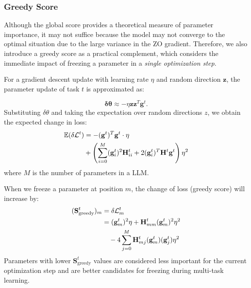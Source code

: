 \subsubsection{Greedy Score}

Although the global score provides a theoretical measure of parameter importance, it may not suffice because the model may not converge to the optimal situation due to the large variance in the ZO gradient. Therefore, we also introduce a greedy score as a practical complement, which considers the immediate impact of freezing a parameter in a {\it single optimization step}. %

For a gradient descent update with learning rate $\eta$ and random direction $\mathbf{z}$, the parameter update of task $t$ is approximated as:

\begin{equation}
\mathbf{\delta \theta} \approx - \eta \mathbf{z} \mathbf{z}^T \mathbf{g}^t.
\end{equation}
Substituting $\delta \theta$ and taking the expectation over random directions $z$, we obtain the expected change in loss:
\begin{align}
\mathbb{E}(\delta \mathcal{L}^t )
&= - (\mathbf{g}^t)^T \mathbf{g}^t \cdot \eta \notag \\
&+ \left( \sum_{i=0}^M (\mathbf{g}^t_i)^2 \mathbf{H}^t_{ii} + 2 (\mathbf{g}_i^t)^T \mathbf{H}^t \mathbf{g}^t \right) \eta^2 \nonumber
\end{align}
where $M$ is the number of parameters in a LLM.

When we freeze a parameter at position $m$, the change of loss (greedy score) will increase by:
\begin{align}
\label{eq:greedyscore}
(\mathbf{S}^t_\text{greedy})_m &= \delta \mathcal{L}^t_m \notag \\
&= (\mathbf{g}^t_m)^2 \eta + \mathbf{H}^t_{mm} (\mathbf{g}^t_m)^2 \eta^2 \notag \\
&\quad - 4 \sum_{j=0}^M \mathbf{H}^t_{mj} (\mathbf{g}^t_m) (\mathbf{g}^t_j) \eta^2
\end{align}
Parameters with lower $\mathbf{S}^t_\text{greedy}$ values are considered less important for the current optimization step and are better candidates for freezing during multi-task learning.


